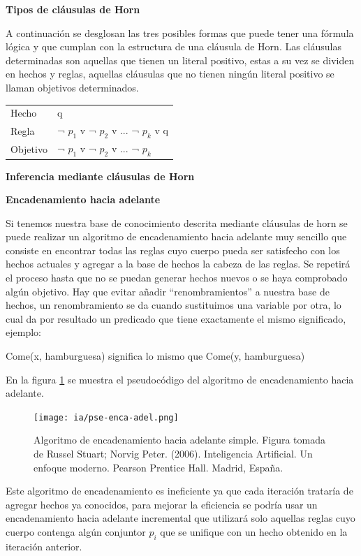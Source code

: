 \documentclass[11pt,fleqn]{book} %
\begin{document}
\textbf{Tipos de cláusulas de Horn}

A continuación se desglosan las tres posibles formas que puede tener una fórmula lógica y que cumplan con la estructura de una cláusula de Horn.
Las cláusulas determinadas son aquellas que tienen un literal positivo, estas a su vez se dividen en hechos y reglas, aquellas cláusulas que no tienen ningún literal positivo se llaman objetivos determinados.

\begin{tabular}{|l|l|}
\hline
	\thead{Nombre} & \thead{Estructura}\\
\hline
	Hecho & q\\
\hline
	Regla & ¬ $p_1$ v ¬ $p_2$ v ... ¬ $p_k$ v q\\
\hline
	Objetivo & ¬ $p_1$ v ¬ $p_2$ v ... ¬ $p_k$\\
\hline
\end{tabular}

\textbf{Inferencia mediante cláusulas de Horn}

\textbf{Encadenamiento hacia adelante}

Si tenemos nuestra base de conocimiento descrita mediante cláusulas de horn se puede realizar un algoritmo de encadenamiento hacia adelante muy sencillo que consiste en encontrar todas las reglas cuyo cuerpo pueda ser satisfecho con los hechos actuales y agregar a la base de hechos la cabeza de las reglas. Se repetirá el proceso hasta que no se puedan generar hechos nuevos o se haya comprobado algún objetivo. Hay que evitar añadir “renombramientos” a nuestra base de hechos, un renombramiento se da cuando sustituimos una variable por otra, lo cual da por resultado un predicado que tiene exactamente el mismo significado, ejemplo: 

Come(x, hamburguesa) significa lo mismo que Come(y, hamburguesa) 

En la figura \ref{fig:pse-enca-adel} se muestra el pseudocódigo del algoritmo de encadenamiento hacia adelante.

\begin{figure}[ht]
\centering\texttt{[image: ia/pse-enca-adel.png]}
\caption{Algoritmo de encadenamiento hacia adelante simple. Figura tomada de Russel Stuart; Norvig Peter. (2006). Inteligencia Artificial. Un enfoque moderno. Pearson Prentice Hall. Madrid, España. \cite{russell2004inteligencia} }

\label{fig:pse-enca-adel} 
\end{figure}

Este algoritmo de encadenamiento es ineficiente ya que cada iteración trataría de agregar hechos ya conocidos, para mejorar la eficiencia se podría usar un encadenamiento hacia adelante incremental que utilizará solo aquellas reglas cuyo cuerpo contenga algún conjuntor $p_i$ que se unifique con un hecho obtenido en la iteración anterior. 
\end{document}
